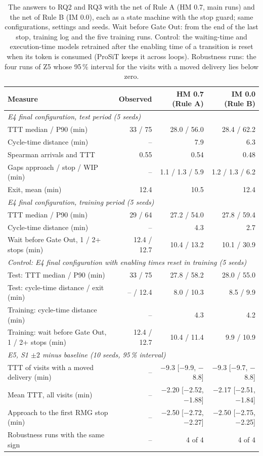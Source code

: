 \begin{table}[htbp]
\centering
\footnotesize
\begin{tabular}{lrrr}
\toprule
\textbf{Measure} & \textbf{Observed} & \textbf{HM 0.7 (Rule A)} & \textbf{IM 0.0 (Rule B)} \\
\midrule
\multicolumn{4}{l}{\textit{E4 final configuration, test period (5 seeds)}} \\
TTT median / P90 (min) & 33 / 75 & 28.0 / 56.0 & 28.4 / 62.2 \\
Cycle-time distance (min) & -- & 7.9 & 6.3 \\
Spearman arrivals and TTT & 0.55 & 0.54 & 0.48 \\
Gaps approach / stop / WIP (min) & -- & 1.1 / 1.3 / 5.9 & 1.2 / 1.3 / 6.2 \\
Exit, mean (min) & 12.4 & 10.5 & 12.4 \\
\midrule
\multicolumn{4}{l}{\textit{E4 final configuration, training period (5 seeds)}} \\
TTT median / P90 (min) & 29 / 64 & 27.2 / 54.0 & 27.8 / 59.4 \\
Cycle-time distance (min) & -- & 4.3 & 2.7 \\
Wait before Gate Out, 1 / 2+ stops (min) & 12.4 / 12.7 & 10.4 / 13.2 & 10.1 / 30.9 \\
\midrule
\multicolumn{4}{l}{\textit{Control: E4 final configuration with enabling times reset in training (5 seeds)}} \\
Test: TTT median / P90 (min) & 33 / 75 & 27.8 / 58.2 & 28.0 / 55.0 \\
Test: cycle-time distance / exit (min) & -- / 12.4 & 8.0 / 10.3 & 8.5 / 9.9 \\
Training: cycle-time distance (min) & -- & 4.3 & 4.2 \\
Training: wait before Gate Out, 1 / 2+ stops (min) & 12.4 / 12.7 & 10.4 / 11.4 & 9.9 / 10.9 \\
\midrule
\multicolumn{4}{l}{\textit{E5, S1 $\pm 2$ minus baseline (10 seeds, 95\,\% interval)}} \\
TTT of visits with a moved delivery (min) & -- & $-$9.3 [$-$9.9, $-$8.8] & $-$9.3 [$-$9.7, $-$8.8] \\
Mean TTT, all visits (min) & -- & $-$2.20 [$-$2.52, $-$1.88] & $-$2.17 [$-$2.51, $-$1.84] \\
Approach to the first RMG stop (min) & -- & $-$2.50 [$-$2.72, $-$2.27] & $-$2.50 [$-$2.75, $-$2.25] \\
Robustness runs with the same sign & -- & 4 of 4 & 4 of 4 \\
\bottomrule
\end{tabular}
\caption{The answers to RQ2 and RQ3 with the net of Rule A (HM 0.7, main runs) and the net of Rule B (IM 0.0), each as a state machine with the stop guard; same configurations, settings and seeds. Wait before Gate Out: from the end of the last stop, training log and the five training runs. Control: the waiting-time and execution-time models retrained after the enabling time of a transition is reset when its token is consumed (ProSiT keeps it across loops). Robustness runs: the four runs of Z5 whose 95\,\% interval for the visits with a moved delivery lies below zero.}
\label{tab:rob_ruleb}
\end{table}

